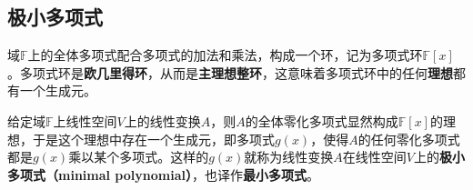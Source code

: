 \subsection{极小多项式}



域$\mathbb{F}$上的全体多项式配合多项式的加法和乘法，构成一个环，记为多项式环$\mathbb{F}[x]$。多项式环是\textbf{欧几里得环}，从而是\textbf{主理想整环}，这意味着多项式环中的任何\textbf{理想}都有一个生成元。

给定域$\mathbb{F}$上线性空间$V$上的线性变换$A$，则$A$的全体零化多项式显然构成$\mathbb{F}[x]$的理想，于是这个理想中存在一个生成元，即多项式$g(x)$，使得$A$的任何零化多项式都是$g(x)$乘以某个多项式。这样的$g(x)$就称为线性变换$A$在线性空间$V$上的\textbf{极小多项式（minimal polynomial）}，也译作\textbf{最小多项式}。




















